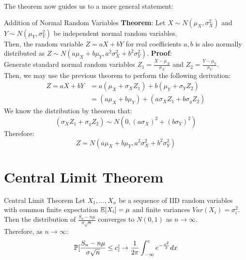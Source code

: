 The theorem now guides us to a more general statement:
\begin{ln-theorem}{Addition of Normal Random Variables}{}
    \textbf{Theorem}: Let $X \sim N(\mu_X, \sigma_X^2)$ and $Y \sim N(\mu_Y, \sigma_Y^2)$ be independent normal random variables. \\
    Then, the random variable $Z = aX + bY$ for real coefficients $a, b$ is also normally distributed as $Z \sim N(a\mu_X + b\mu_Y, a^2 \sigma_X^2 + b^2 \sigma_Y^2)$.
    \tcblower
    \textbf{Proof}: \\
    Generate standard normal random variables $Z_1 = \frac{X - \mu_X}{\sigma_X}$ and $Z_2 = \frac{Y - \mu_Y}{\sigma_Y}$. \\
    Then, we may use the previous theorem to perform the following derivation:
    \begin{align*}
        Z = aX + bY &= a(\mu_X + \sigma_X Z_1) + b(\mu_Y + \sigma_Y Z_2) \\
        &= (a\mu_X + b\mu_Y) + (a\sigma_X Z_1 + b\sigma_y Z_2)
    \end{align*}
    We know the distribution by theorem that:
    \[(\sigma_X Z_1 + \sigma_y Z_2) \sim N(0, {(a \sigma_X)}^2 + {(b\sigma_Y)}^2)\]
    Therefore:
    \[Z = N(a\mu_X + b\mu_Y, a^2 \sigma_X^2 + b^2 \sigma_Y^2)\]
\end{ln-theorem}

\section{Central Limit Theorem}
\begin{ln-theorem}{Central Limit Theorem}{}
    Let $X_1, \dots, X_n$ be a sequence of IID random variables with common finite expectation $\E[X_i] = \mu$ and finite variances $Var(X_i) = \sigma_i^2$. \\
    Then the distribution of $\frac{S_n - n\mu}{\sigma \sqrt{n}}$ converges to $N(0, 1)$ as $n \rightarrow \infty$. \\
    Therefore, as $n \rightarrow \infty$:
    \[
        \P[\frac{S_n - n\mu}{\sigma \sqrt{n}} \leq c] \rightarrow \frac{1}{2\pi} \int_{-\infty}^c e^{-\frac{x^2}{2}} dx
    \]
\end{ln-theorem}
